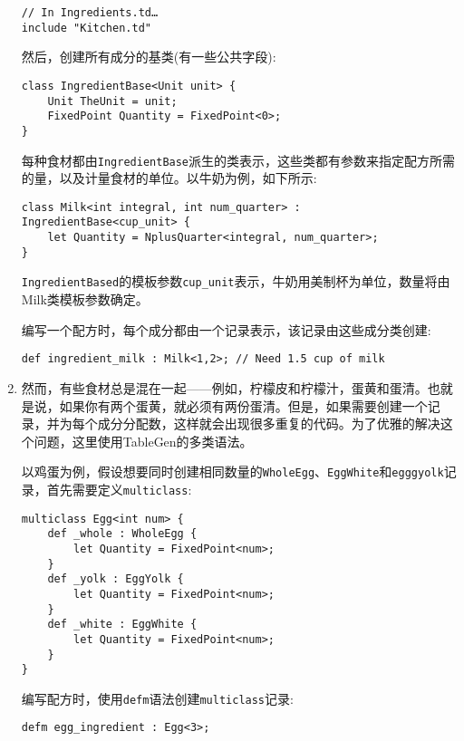 \begin{enumerate}
\begin{lstlisting}[style=styleCXX]
// In Ingredients.td…
include "Kitchen.td"
\end{lstlisting}

然后，创建所有成分的基类(有一些公共字段):

\begin{lstlisting}[style=styleCXX]
class IngredientBase<Unit unit> {
	Unit TheUnit = unit;
	FixedPoint Quantity = FixedPoint<0>;
}
\end{lstlisting}

每种食材都由\texttt{IngredientBase}派生的类表示，这些类都有参数来指定配方所需的量，以及计量食材的单位。以牛奶为例，如下所示:

\begin{lstlisting}[style=styleCXX]
class Milk<int integral, int num_quarter> :
IngredientBase<cup_unit> {
	let Quantity = NplusQuarter<integral, num_quarter>;
}
\end{lstlisting}

\texttt{IngredientBased}的模板参数\texttt{cup\_unit}表示，牛奶用美制杯为单位，数量将由Milk类模板参数确定。

编写一个配方时，每个成分都由一个记录表示，该记录由这些成分类创建:

\begin{lstlisting}[style=styleCXX]
def ingredient_milk : Milk<1,2>; // Need 1.5 cup of milk
\end{lstlisting}

\item 然而，有些食材总是混在一起——例如，柠檬皮和柠檬汁，蛋黄和蛋清。也就是说，如果你有两个蛋黄，就必须有两份蛋清。但是，如果需要创建一个记录，并为每个成分分配数，这样就会出现很多重复的代码。为了优雅的解决这个问题，这里使用TableGen的多类语法。

以鸡蛋为例，假设想要同时创建相同数量的\texttt{WholeEgg}、\texttt{EggWhite}和\texttt{egggyolk}记录，首先需要定义\texttt{multiclass}:

\begin{lstlisting}[style=styleCXX]
multiclass Egg<int num> {
	def _whole : WholeEgg {
		let Quantity = FixedPoint<num>;
	}
	def _yolk : EggYolk {
		let Quantity = FixedPoint<num>;
	}
	def _white : EggWhite {
		let Quantity = FixedPoint<num>;
	}
}
\end{lstlisting}

编写配方时，使用\texttt{defm}语法创建\texttt{multiclass}记录:

\begin{lstlisting}[style=styleCXX]
defm egg_ingredient : Egg<3>;
\end{lstlisting}


\end{enumerate}
